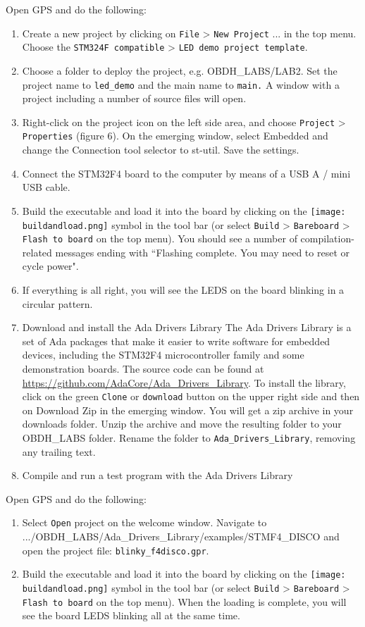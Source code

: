 Open GPS and do the following:
\begin{enumerate}
\item Create a new project by clicking on {\tt File} > {\tt New Project} ... in the top menu. Choose the {\tt STM324F compatible} > {\tt LED demo project template}.
\item	Choose a folder to deploy the project, e.g. OBDH\_LABS/LAB2. Set the project name to {\tt led\_demo} and the main name to {\tt main.} A window with a project including a number of source files will open.
\item	Right-click on the project icon on the left side area, and choose {\tt Project} > {\tt Properties} (figure 6). On the emerging window, select Embedded and change the Connection tool selector to st-util. Save the settings.
\item	Connect the STM32F4 board to the computer by means of a USB A / mini USB cable.
\item	Build the executable and load it into the board by clicking on the
\hbox{\texttt{[image: buildandload.png]}} symbol in the tool bar (or select {\tt Build} > {\tt Bareboard} > {\tt Flash to board} on the top menu). You should see a number of compilation-related messages ending with ``Flashing complete. You may need to reset or cycle power".
\item	If everything is all right, you will see the LEDS on the board blinking in a circular pattern.
\item Download and install the Ada Drivers Library
The Ada Drivers Library is a set of Ada packages that make it easier to write software for embedded devices, including the STM32F4 microcontroller family and some demonstration boards. The source code can be found at \url{https://github.com/AdaCore/Ada\_Drivers\_Library}. To install the library, click on the green {\tt Clone} or {\tt download} button on the upper right side and then on Download Zip in the emerging window. You will get a zip archive in your downloads folder. Unzip the archive and move the resulting folder to your OBDH\_LABS folder. Rename the folder to {\tt Ada\_Drivers\_Library}, removing any trailing text.
\item Compile and run a test program with the Ada Drivers Library
\end{enumerate}
Open GPS and do the following:
\begin{enumerate}
\item Select {\tt Open} project on the welcome window. Navigate to .../OBDH\_LABS/\-Ada\_Drivers\_Library/examples/STMF4\_DISCO and open the project file: {\tt blinky\-\_f4disco.gpr}.
\item	Build the executable and load it into the board by clicking on the \hbox{\texttt{[image: buildandload.png]}} symbol in the tool bar (or select {\tt Build} > {\tt Bareboard} > {\tt Flash to board} on the top menu). When the loading is complete, you will see the board LEDS blinking all at the same time.
\end{enumerate}

